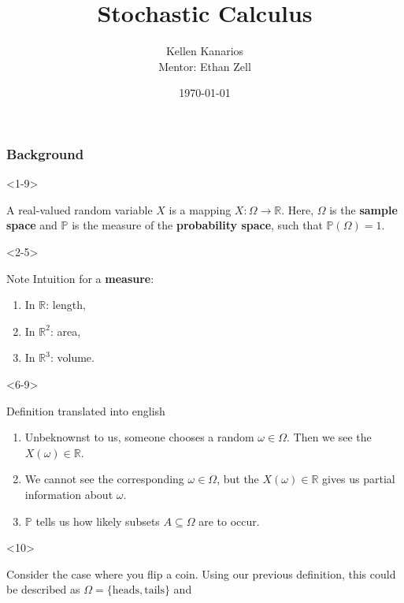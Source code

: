 \documentclass[10pt]{beamer}
\title{Stochastic Calculus}
\author{Kellen Kanarios \\ \vskip 10pt \footnotesize{Mentor: Ethan Zell}}
\institute{University of Michigan}
\date{\today}
\begin{document}
\begin{frame}
\titlepage
\end{frame}

\begin{frame}[t]
  \frametitle{Background}
  \begin{onlyenv}<1-9>
    \begin{definition}
      A real-valued random variable $X$ is a mapping $X : \Omega \to \mathbb{R}$. Here, $\Omega$ is the \textbf{sample space} and $\mathbb{P}$ is the measure of the \textbf{probability space}, such that $\mathbb{P}(\Omega) = 1$.
    \end{definition}
  \end{onlyenv}
  \begin{onlyenv}<2-5>
      \begin{block}{Note}
        Intuition for a \textbf{measure}:
        \begin{enumerate}
          \item <3-> In $\mathbb{R}$: length,
          \item <4-> In $\mathbb{R}^2$: area,
          \item <5-> In $\mathbb{R}^3$: volume.
        \end{enumerate}
      \end{block}
  \end{onlyenv}
  \begin{onlyenv}<6-9>
      \begin{block}{Definition translated into english}
        \begin{enumerate}
          \item<7->
            Unbeknownst to us, someone chooses a random $\omega \in \Omega$. Then we see the $X(\omega) \in \mathbb{R}$.
          \item<8->
            We cannot see the corresponding $\omega \in \Omega$, but the $X(\omega) \in \mathbb{R}$ gives us partial information about $\omega$.
          \item<9-> $\mathbb{P}$ tells us how likely subsets $A \subseteq \Omega$ are to occur.
        \end{enumerate}
      \end{block}
  \end{onlyenv}
  \begin{onlyenv}<10>
    \begin{example}
      Consider the case where you flip a coin. Using our previous definition, this could be described as $\Omega = \{\text{heads}, \text{tails}\}$ and \\

\end{example}
\end{onlyenv}
\end{frame}
\end{document}
